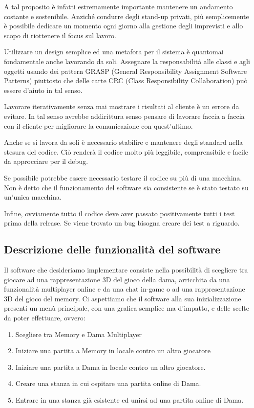\documentclass[12pt]{article}
\begin{document}
A tal proposito è infatti estremamente importante mantenere un andamento costante e sostenibile. Anziché condurre degli stand-up privati, più semplicemente è possibile dedicare un momento ogni giorno alla gestione degli imprevisti e allo scopo di riottenere il focus sul lavoro.

Utilizzare un design semplice ed una metafora per il sistema è quantomai fondamentale anche lavorando da soli. Assegnare la responsabilità alle classi e agli oggetti usando dei pattern GRASP (General Responsibility Assignment Software Patterns) piuttosto che delle carte CRC (Class Responsibility Collaboration) può essere d'aiuto in tal senso.

Lavorare iterativamente senza mai mostrare i risultati al cliente è un errore da evitare. In tal senso avrebbe addirittura senso pensare di lavorare faccia a faccia con il cliente per migliorare la comunicazione con quest'ultimo.

Anche se si lavora da soli è necessario stabilire e mantenere degli standard nella stesura del codice. Ciò renderà il codice molto più leggibile, comprensibile e facile da approcciare per il debug.

Se possibile potrebbe essere necessario testare il codice su più di una macchina. Non è detto che il funzionamento del software sia consistente se è stato testato su un'unica macchina.

Infine, ovviamente tutto il codice deve aver passato positivamente tutti i test prima della release. Se viene trovato un bug bisogna creare dei test a riguardo.

\subsection{Descrizione delle funzionalità del software}
Il software che desideriamo implementare consiste nella possibilità di scegliere tra giocare ad una rappresentazione 3D del gioco della dama, arricchita da una funzionalità multiplayer online e da una chat in-game o ad una rappresentazione 3D del gioco del memory. Ci aspettiamo che il software alla sua inizializzazione presenti un menù principale, con una grafica semplice ma d'impatto, e delle scelte da poter effettuare, ovvero:

\begin{enumerate}
\item Scegliere tra Memory e Dama Multiplayer
\item Iniziare una partita a Memory in locale contro un altro giocatore
\item Iniziare una partita a Dama in locale contro un altro giocatore.
\item Creare una stanza in cui ospitare una partita online di Dama.
\item Entrare in una stanza già esistente ed unirsi ad una partita online di Dama.
\end{enumerate}
\end{document}
